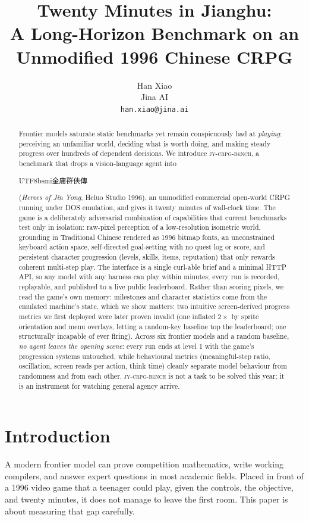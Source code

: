 \documentclass{article} %
\title{Twenty Minutes in Jianghu: \\ A Long-Horizon Benchmark on an
Unmodified 1996 Chinese CRPG}
\author{Han Xiao \\
Jina AI \\
\texttt{han.xiao@jina.ai}}
\newcommand{\bench}{\textsc{jy-crpg-bench}}
\newcommand{\game}[1]{\begin{CJK}{UTF8}{bsmi}#1\end{CJK}}
\begin{document}
\maketitle

\begin{abstract}
Frontier models saturate static benchmarks yet remain conspicuously bad at
\emph{playing}: perceiving an unfamiliar world, deciding what is worth doing,
and making steady progress over hundreds of dependent decisions. We introduce
\bench{}, a benchmark that drops a vision-language agent into
\game{金庸群俠傳} (\emph{Heroes of Jin Yong}, Heluo Studio 1996), an
unmodified commercial open-world CRPG running under DOS emulation, and gives
it twenty minutes of wall-clock time. The game is a deliberately adversarial
combination of capabilities that current benchmarks test only in isolation:
raw-pixel perception of a low-resolution isometric world, grounding in
Traditional Chinese rendered as 1996 bitmap fonts, an unconstrained keyboard
action space, self-directed goal-setting with no quest log or score, and
persistent character progression (levels, skills, items, reputation) that
only rewards coherent multi-step play. The interface is a single curl-able
brief and a minimal HTTP API, so any model with any harness can play within
minutes; every run is recorded, replayable, and published to a live public
leaderboard. Rather than scoring pixels, we read the game's own memory:
milestones and character statistics come from the emulated machine's state,
which we show matters: two intuitive screen-derived progress metrics we first
deployed were later proven invalid (one inflated $2\times$ by sprite
orientation and menu overlays, letting a random-key baseline top the
leaderboard; one structurally incapable of ever firing). Across six frontier
models and a random baseline, \emph{no agent leaves the opening scene}: every
run ends at level 1 with the game's progression systems untouched, while
behavioural metrics (meaningful-step ratio, oscillation, screen reads per
action, think time) cleanly separate model behaviour from randomness and from
each other. \bench{} is not a task to be solved this year; it is an
instrument for watching general agency arrive.
\end{abstract}

\section{Introduction}

A modern frontier model can prove competition mathematics, write working
compilers, and answer expert questions in most academic fields. Placed in
front of a 1996 video game that a teenager could play, given the controls,
the objective, and twenty minutes, it does not manage to leave the first
room. This paper is about measuring that gap carefully.
\end{document}
